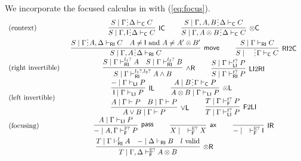 \documentclass[submission,copyright,creativecommons]{eptcs}
\theoremstyle{definition}
\newcommand{\tl}{\otimes \mathsf{L}}
\newcommand{\tr}{\otimes \mathsf{R}}
\newcommand{\tc}{\otimes \mathsf{C}}
\newcommand{\pass}{\mathsf{pass}}
\newcommand{\unitl}{\mathsf{IL}}
\newcommand{\unitr}{\mathsf{IR}}
\newcommand{\unitc}{\mathsf{IC}}
\newcommand{\andr}{\land \mathsf{R}}
\newcommand{\orl}{\lor \mathsf{L}}
\newcommand{\ax}{\mathsf{ax}}
\newcommand{\ot}{\otimes}
\newcommand{\I}{\mathsf{I}}
\newcommand{\C}{\mathsf{C}}
\newcommand{\RI}{\mathsf{RI}}
\newcommand{\LI}{\mathsf{LI}}
\newcommand{\F}{\mathsf{F}}
\newcommand{\tP}{\mathbb{P}}
\newcommand{\tE}{\mathbb{E}}
\newcommand{\spl}{\raisebox{-1.5pt}[0.5\height]{\hspace{1pt}\vdots\hspace{1pt}}}
\newcommand{\proofbox}[1]{\begin{tabular}{l} #1 \end{tabular}}
\begin{document}
We incorporate the focused calculus in \cite{uustalu:proof:nodate} with (\ref{eq:focus}).
\begin{equation}\label{eq:focus:partial:normal}
  \begin{array}{lc}
    \text{(context)} &
    \proofbox{
      \infer[\unitc]{S \mid \Gamma , \I \spl \Delta \vdash_{\C} C}{S \mid \Gamma \spl \Delta \vdash_{\C} C}
      \qquad
      \infer[\tc]{S \mid \Gamma , A \ot B \spl \Delta \vdash_{\C} C}{S \mid \Gamma , A , B \spl \Delta \vdash_{\C} C}
    }
    \\[10pt]
    &
    \proofbox{
      \infer[\mathsf{move}]{S \mid \Gamma , A \spl \Delta \vdash_{\RI} C}{
        S \mid \Gamma \spl A , \Delta \vdash_{\RI} C
        &
        A \neq \I \ \text{and} \ A \neq A' \ot B'
      }
      \qquad
      \infer[\RI 2 \C]{S \mid \quad \spl \Gamma \vdash_{\C} C}{S \mid \Gamma \vdash_{\RI} C}
    }
    \\
    \text{(right invertible)} & %
    \proofbox{
      \infer[\andr]{S \mid \Gamma \vdash^{l_1?, l_2?}_{\RI} A \land B}{
        S \mid \Gamma \vdash^{l_1?}_{\RI} A
        &
        S \mid \Gamma \vdash^{l_2?}_{\RI} B
      }
    \qquad
    \infer[\LI 2 \RI]{S \mid \Gamma \vdash^{t?}_{\RI} P}{S \mid \Gamma \vdash^{t?}_{\LI} P}
    }
    \\[10pt]
    \text{(left invertible)} & %
    \proofbox{
      \infer[\unitl]{\I \mid \Gamma \vdash_{\LI} P}{{-} \mid \Gamma \vdash_{\LI} P}
    \qquad
    \infer[\tl]{A \ot B \mid \Gamma \vdash_{\LI} P}{A \mid B \spl \Gamma \vdash_{\C} P}
    \\
    \infer[\orl]{A \lor B \mid \Gamma \vdash P}{
      A \mid \Gamma \vdash P
      &
      B \mid \Gamma \vdash P
    }
    \qquad
    \infer[\F 2 \LI]{T \mid \Gamma \vdash^{t?}_{\LI} P}{T \mid \Gamma \vdash^{t?}_{\F} P}
    }
    \\[10pt]
    \text{(focusing)} &    %
    \proofbox{
    \infer[\pass]{{-} \mid A , \Gamma \vdash^{\tP?}_{\F} P }{
        A \mid \Gamma \vdash_{\LI} P
    }
    \qquad
    \infer[\ax]{X \mid \quad \vdash^{\tE?}_{\F} X}{}
    \qquad
    \infer[\unitr]{{-} \mid \quad \vdash^{\tE?}_{\F} \I}{}
    }
    \\[10pt]
    \multicolumn{2}{c}{
    \infer[\tr]{T \mid \Gamma , \Delta \vdash^{\tE?}_{\F} A \ot B}{
      T \mid \Gamma \vdash^{l}_{\RI} A
      &
      {-} \mid \Delta \vdash_{\RI} B
      &
      l \ \text{valid}
    }
}
\end{array}
\end{equation}
\end{document}
